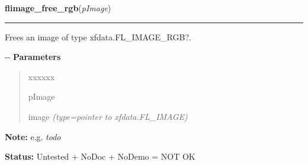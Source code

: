 \hspace{.8\funcindent}\begin{boxedminipage}{\funcwidth}

    \raggedright \textbf{flimage\_free\_rgb}(\textit{pImage})

    \vspace{-1.5ex}

    \rule{\textwidth}{0.5\fboxrule}
\setlength{\parskip}{2ex}

Frees an image of type xfdata.FL\_IMAGE\_RGB?.

-{}-
\setlength{\parskip}{1ex}
      \textbf{Parameters}
      \vspace{-1ex}

      \begin{quote}
        \begin{Ventry}{xxxxxx}

          \item[pImage]


image
            {\it (type=pointer to xfdata.FL\_IMAGE)}

        \end{Ventry}

      \end{quote}

\textbf{Note:} 
e.g. \emph{todo}


\textbf{Status:} 
Untested + NoDoc + NoDemo = NOT OK


    \end{boxedminipage}

    \label{xformslib:flflimage:flimage_freemem}

    \vspace{0.5ex}

